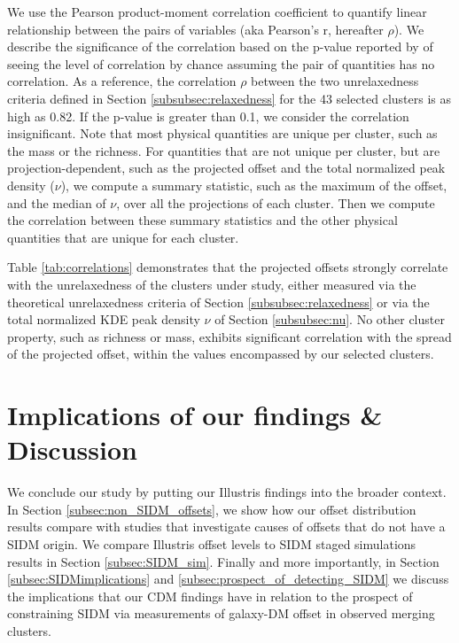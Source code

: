 \documentclass[usenatbib]{mn2e}
\begin{document}
{We use the Pearson product-moment correlation coefficient to quantify linear 
relationship between the pairs of variables
(aka Pearson's r,  hereafter $\rho$).
We describe the significance of the correlation 
based on the p-value reported by {} of seeing the level of 
correlation by chance assuming the pair of 
quantities has no correlation. As a reference, the correlation $\rho$ between the 
two unrelaxedness criteria defined in Section \ref{subsubsec:relaxedness}
for the 43 selected clusters is as high as 0.82.
 If the p-value is greater than 0.1, we consider the
correlation insignificant. Note that most physical quantities are unique per cluster, such as the mass or
the richness. For quantities that are not unique per cluster, but are projection-dependent,
such as the projected offset and the total normalized peak density ($\nu$), 
we compute a summary statistic, such as the
maximum of the offset, and the median of $\nu$, over all the projections of
each cluster.  Then we compute the correlation between these summary statistics and the other physical quantities that
are unique for each cluster.

Table \ref{tab:correlations} demonstrates that the projected offsets strongly correlate with the unrelaxedness of the clusters under study, either measured via the theoretical unrelaxedness criteria of Section \ref{subsubsec:relaxedness} or via the total normalized KDE peak density $\nu$ of Section \ref{subsubsec:nu}. No other cluster property, such as richness or mass, exhibits significant correlation with the spread of the projected offset, within the values encompassed by our selected clusters.


\section{Implications of our findings \& Discussion}
\label{sec:discussion}

We conclude our study by putting our Illustris findings into the broader context.
In Section \ref{subsec:non_SIDM_offsets}, we show how our offset distribution results compare with studies that investigate causes of offsets that do not have a SIDM origin. We compare Illustris offset levels to SIDM staged simulations results in Section \ref{subsec:SIDM_sim}. Finally and more importantly, in Section \ref{subsec:SIDMimplications} and \ref{subsec:prospect_of_detecting_SIDM} we discuss the implications that our CDM findings have in relation to the prospect of constraining SIDM via measurements of galaxy-DM offset in observed merging clusters. 


}
\end{document}
